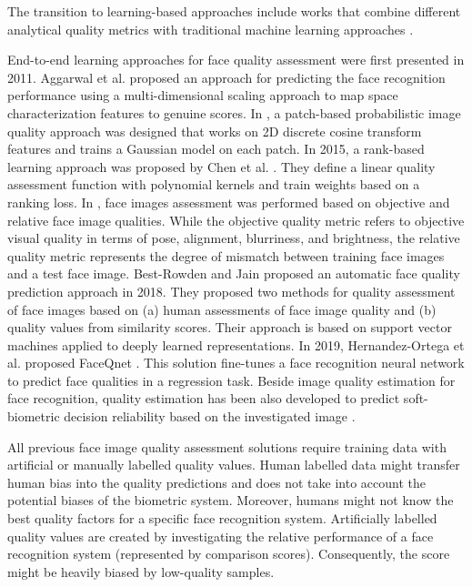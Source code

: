 \documentclass[10pt,twocolumn,letterpaper]{article}
\begin{document}
The transition to learning-based approaches include works that combine different analytical quality metrics with traditional machine learning approaches \cite{6712715, 6985846, 4341617, 6460821, 6996248}.


End-to-end learning approaches for face quality assessment were first presented in 2011.
Aggarwal et al. \cite{5981784} proposed an approach for predicting the face recognition performance using a multi-dimensional scaling approach to map space characterization features to genuine scores.
In \cite{5981881}, a patch-based probabilistic image quality approach was designed that works on 2D discrete cosine transform features and trains a Gaussian model on each patch.
In 2015, a rank-based learning approach was proposed by Chen et al. \cite{6877651}.
They define a linear quality assessment function with polynomial kernels and train weights based on a ranking loss.
In \cite{7351562}, face images assessment was performed based on objective and relative face image qualities.
While the objective quality metric refers to objective visual quality in terms of pose, alignment, blurriness, and brightness, the relative quality metric represents the degree of mismatch between training face images and a test face image.
Best-Rowden and Jain \cite{DBLP:journals/corr/Best-RowdenJ17} proposed an automatic face quality prediction approach in 2018.
They proposed two methods for quality assessment of face images based on (a) human assessments of face image quality and (b) quality values from similarity scores.
Their approach is based on support vector machines applied to deeply learned representations.
In 2019, Hernandez-Ortega et al. proposed FaceQnet \cite{DBLP:journals/corr/abs-1904-01740}.
This solution fine-tunes a face recognition neural network to predict face qualities in a regression task.
Beside image quality estimation for face recognition, quality estimation has been also developed to predict soft-biometric decision reliability based on the investigated image \cite{DBLP:conf/btas/Terhoerst19}.

All previous face image quality assessment solutions require training data with artificial or manually labelled quality values.
Human labelled data might transfer human bias into the quality predictions and does not take into account the potential biases of the biometric system.
Moreover, humans might not know the best quality factors for a specific face recognition system.
Artificially labelled quality values are created by investigating the relative performance of a face recognition system (represented by comparison scores).
Consequently, the score might be heavily biased by low-quality samples. 
\end{document}
